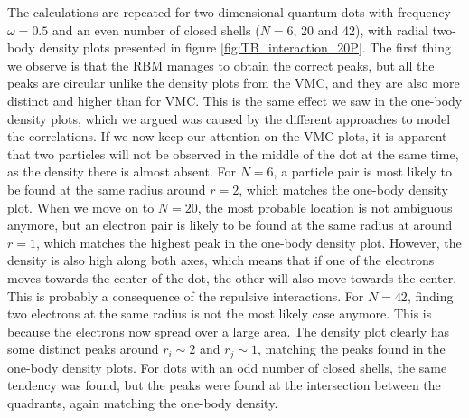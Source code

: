 The calculations are repeated for two-dimensional quantum dots with frequency $\omega=0.5$ and an even number of closed shells ($N=6$, 20 and 42), with radial two-body density plots presented in figure \eqref{fig:TB_interaction_20P}. The first thing we observe is that the RBM manages to obtain the correct peaks, but all the peaks are circular unlike the density plots from the VMC, and they are also more distinct and higher than for VMC. This is the same effect we saw in the one-body density plots, which we argued was caused by the different approaches to model the correlations. If we now keep our attention on the VMC plots, it is apparent that two particles will not be observed in the middle of the dot at the same time, as the density there is almost absent. For $N=6$, a particle pair is most likely to be found at the same radius around $r=2$, which matches the one-body density plot. When we move on to $N=20$, the most probable location is not ambiguous anymore, but an electron pair is likely to be found at the same radius at around $r=1$, which matches the highest peak in the one-body density plot. However, the density is also high along both axes, which means that if one of the electrons moves towards the center of the dot, the other will also move towards the center. This is probably a consequence of the repulsive interactions. For $N=42$, finding two electrons at the same radius is not the most likely case anymore. This is because the electrons now spread over a large area. The density plot clearly has some distinct peaks around $r_i\sim 2$ and $r_j\sim 1$, matching the peaks found in the one-body density plots. For dots with an odd number of closed shells, the same tendency was found, but the peaks were found at the intersection between the quadrants, again matching the one-body density. 

